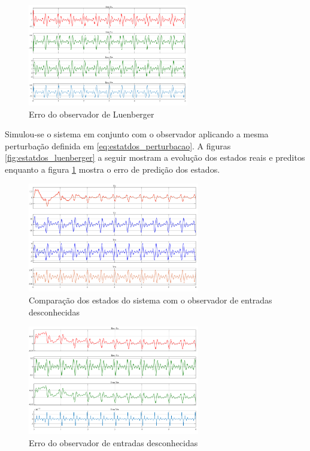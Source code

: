 \begin{figure}[htbp]
    \begin{centering}
    \includegraphics[width=7cm]{img/estatdos_erro_luenberg.png} 
    \caption{Erro do observador de Luenberger}
    \label{fig:estatdos_erro_luenberg}
    \end{centering}
\end{figure}
\FloatBarrier

Simulou-se o sistema em conjunto com o observador aplicando a mesma perturbação definida em \eqref{eq:estatdos_perturbacao}.
A figuras \ref{fig:estatdos_luenberger} a seguir mostram a evolução dos estados reais e preditos enquanto a figura \ref{fig:estatdos_erro_luenberg} mostra o erro de predição dos estados.

\FloatBarrier
\begin{figure}[htbp]
    \begin{centering}
    \includegraphics[width=7.5cm]{img/estatdos_UIO.png} 
    \caption{Comparação dos estados do sistema com o observador de entradas desconhecidas}
    \label{fig:estatdos_UIO}
    \end{centering}
\end{figure}
\FloatBarrier

\FloatBarrier
\begin{figure}[htbp]
    \begin{centering}
    \includegraphics[width=7.5cm]{img/estatdos_Erro_UIO.png} 
    \caption{Erro do observador de entradas desconhecidas}
    \label{fig:estatdos_erro_UIO}
    \end{centering}
\end{figure}
\FloatBarrier

